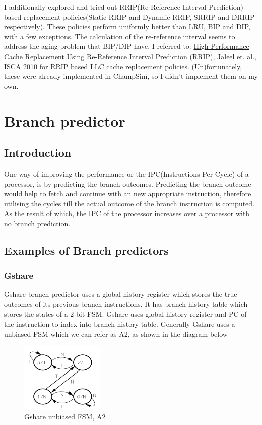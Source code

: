 \documentclass[a4paper]{article}
\begin{document}
            I additionally explored and tried out RRIP(Re-Reference Interval Prediction) based replacement policies(Static-RRIP and Dynamic-RRIP, SRRIP and DRRIP respectively). These policies perform uniformly better than LRU, BIP and DIP, with a few exceptions. The calculation of the re-reference interval seems to address the aging problem that BIP/DIP have. I referred to: \href{https://people.csail.mit.edu/emer/papers/2010.06.isca.rrip.pdf}{High Performance Cache Replacement Using Re-Reference Interval Prediction (RRIP), Jaleel et. al., ISCA 2010} for RRIP based LLC cache replacement policies. (Un)fortunately, these were already implemented in ChampSim, so I didn't implement them on my own.
        
\pagebreak
\section{Branch predictor}
    \subsection{Introduction}
        One way of improving the performance or the IPC(Instructions Per Cycle) of a processor, is by predicting the branch outcomes. Predicting the branch outcome would help to fetch and continue with an new appropriate instruction, therefore utilising the cycles till  the actual outcome of the branch instruction is computed. As the result of which, the IPC of the processor increases over a processor with no branch prediction.
    \subsection{Examples of Branch predictors}
        \subsubsection{Gshare}
            Gshare branch predictor uses a global history register which stores the true outcomes of its previous branch instructions. It has branch history table which stores the states of a 2-bit FSM. Gshare uses global history register and PC of the instruction to index into branch history table. Generally Gshare uses a unbiased FSM which we can refer as A2, as shown in the diagram below
            \begin{figure}[ht]
                \centerline{\includegraphics[width= 4cm]{images/veerendra/gshare_a2.png}}
                \caption{Gshare unbiased FSM, A2}
                \label{fig_gshare_a2}
            \end{figure}
\end{document}
